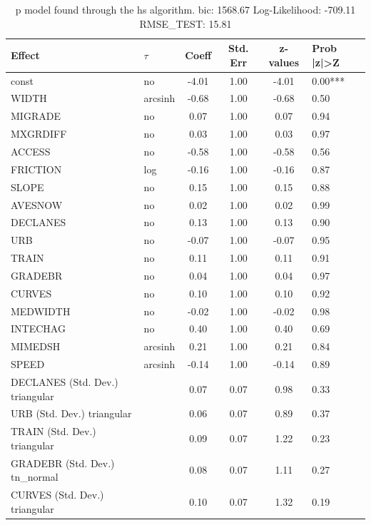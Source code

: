 \begin{table}
	\caption{p model found through the hs algorithm. bic: 1568.67 Log-Likelihood: -709.11 RMSE_TEST: 15.81}
	\begin{center}
		\begin{tabular}{|l|l|c|c|c|l|}
			\hline
			Effect & $\tau$ & Coeff & Std. Err & z-values & Prob |z|>Z \\
			\hline
			const & no & -4.01 & 1.00 & -4.01 & 0.00*** \\
			\hline
			WIDTH & arcsinh & -0.68 & 1.00 & -0.68 & 0.50 \\
			\hline
			MIGRADE & no & 0.07 & 1.00 & 0.07 & 0.94 \\
			\hline
			MXGRDIFF & no & 0.03 & 1.00 & 0.03 & 0.97 \\
			\hline
			ACCESS & no & -0.58 & 1.00 & -0.58 & 0.56 \\
			\hline
			FRICTION & log & -0.16 & 1.00 & -0.16 & 0.87 \\
			\hline
			SLOPE & no & 0.15 & 1.00 & 0.15 & 0.88 \\
			\hline
			AVESNOW & no & 0.02 & 1.00 & 0.02 & 0.99 \\
			\hline
			DECLANES & no & 0.13 & 1.00 & 0.13 & 0.90 \\
			\hline
			URB & no & -0.07 & 1.00 & -0.07 & 0.95 \\
			\hline
			TRAIN & no & 0.11 & 1.00 & 0.11 & 0.91 \\
			\hline
			GRADEBR & no & 0.04 & 1.00 & 0.04 & 0.97 \\
			\hline
			CURVES & no & 0.10 & 1.00 & 0.10 & 0.92 \\
			\hline
			MEDWIDTH & no & -0.02 & 1.00 & -0.02 & 0.98 \\
			\hline
			INTECHAG & no & 0.40 & 1.00 & 0.40 & 0.69 \\
			\hline
			MIMEDSH & arcsinh & 0.21 & 1.00 & 0.21 & 0.84 \\
			\hline
			SPEED & arcsinh & -0.14 & 1.00 & -0.14 & 0.89 \\
			\hline
			DECLANES (Std. Dev.) triangular &  & 0.07 & 0.07 & 0.98 & 0.33 \\
			\hline
			URB (Std. Dev.) triangular &  & 0.06 & 0.07 & 0.89 & 0.37 \\
			\hline
			TRAIN (Std. Dev.) triangular &  & 0.09 & 0.07 & 1.22 & 0.23 \\
			\hline
			GRADEBR (Std. Dev.) tn_normal &  & 0.08 & 0.07 & 1.11 & 0.27 \\
			\hline
			CURVES (Std. Dev.) triangular &  & 0.10 & 0.07 & 1.32 & 0.19 \\

\end{tabular}
\end{center}
\end{table}
